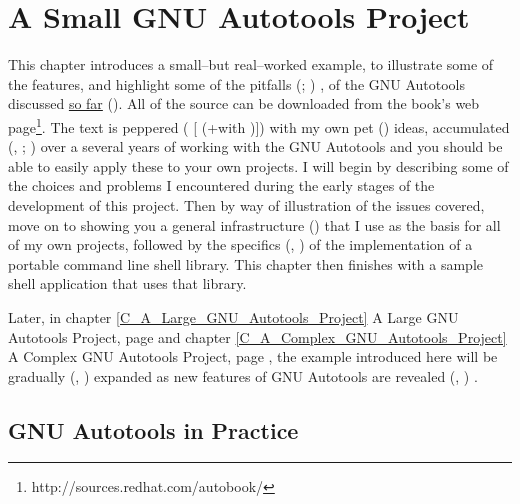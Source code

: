\chapter{A Small GNU Autotools Project}\label{C_A_Small_GNU_Autotools_Project}


This chapter introduces a small--but real--worked example, to illustrate 
some of the features, and highlight some of the pitfalls ({\MjQ{}}; {\MeQ{}}) , of the 
GNU Autotools discussed \underline{so far} ({\MaQ{}}). All of the source 
can be downloaded from 
the book's web page\footnote{http://sources.redhat.com/autobook/}.
The text is peppered ({\MaQ{}} [ (+with )]) with my own pet ({\MbQ{}}) ideas,
accumulated ({\MhQ{}}, {\McQ{}}; {\McQ{}}) over a several years of working with the 
GNU Autotools and you should be able to easily apply these to your 
own projects. I will begin by describing some of the choices and problems I 
encountered during the early stages of the development of this project. 
Then by way of illustration of the issues covered, move on to showing 
you a general infrastructure ({\MeQ{}}) that I use as the basis for all 
of my own projects, followed by the specifics ({\MiQ{}}, {\McQ{}}) of the 
implementation of a portable command line shell library. This 
chapter then finishes with a sample shell application that uses that library. 


Later, in chapter \ref{C_A_Large_GNU_Autotools_Project}
A Large GNU Autotools Project, page \pageref{C_A_Large_GNU_Autotools_Project}
and chapter \ref{C_A_Complex_GNU_Autotools_Project} A Complex GNU 
Autotools Project,
page \pageref{C_A_Complex_GNU_Autotools_Project}, the example introduced 
here will be gradually ({\MjQ{}}, {\MgQ{}}) expanded as new features 
of GNU Autotools are revealed ({\MbQ{}}, {\MjQ{}}) .

\section{GNU Autotools in Practice}


